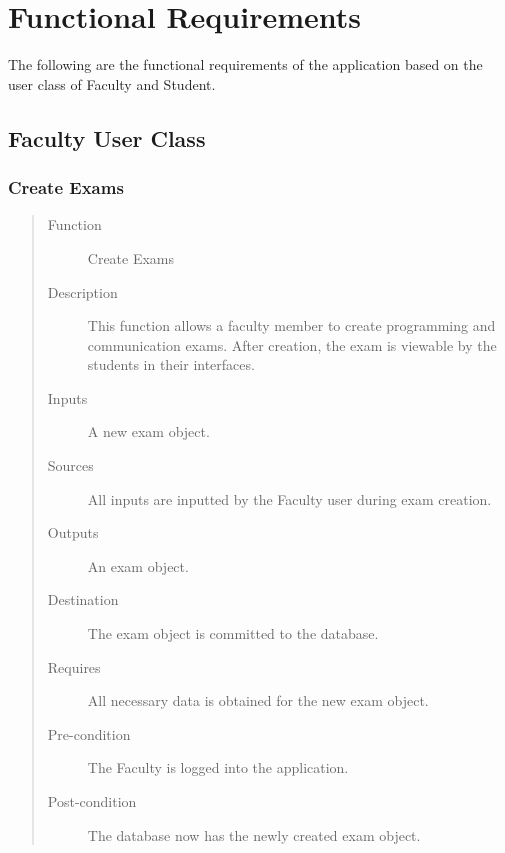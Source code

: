 %
%

\section{Functional Requirements}
The following are the functional requirements of the application based on the
user class of Faculty and Student.
\subsection{Faculty User Class}
\subsubsection{Create Exams}
\begin{quote} %
\begin{description}
\item[Function]
   Create Exams
\item[Description]
   This function allows a faculty member to create programming and communication
   exams. After creation, the exam is viewable by the students in their
   interfaces.
\item[Inputs]
   A new exam object.
\item[Sources]
   All inputs are inputted by the Faculty user during exam creation.
\item[Outputs]
   An exam object.
\item[Destination]
   The exam object is committed to the database.
\item[Requires]
   All necessary data is obtained for the new exam object.
\item[Pre-condition]
   The Faculty is logged into the application.
\item[Post-condition]
   The database now has the newly created exam object.
\end{description}
\end{quote} %

